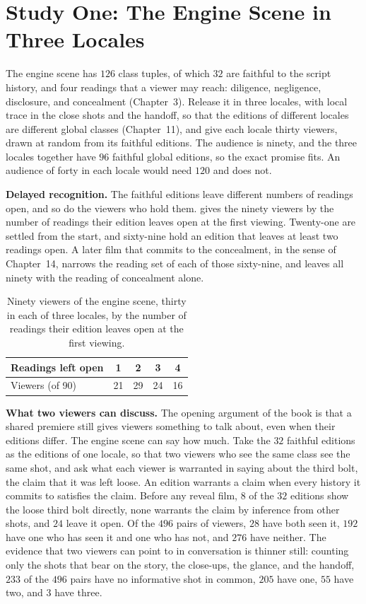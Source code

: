 \documentclass[11pt,twoside,openright]{book}
\theoremstyle{plain}
\theoremstyle{definition}
\theoremstyle{remark}
\begin{document}
\section{Study One: The Engine Scene in Three Locales}\label{sec:engine17}

The engine scene has $126$ class tuples, of which $32$ are faithful to the script history, and four readings that a viewer may reach: diligence, negligence, disclosure, and concealment (Chapter~3). Release it in three locales, with local trace in the close shots and the handoff, so that the editions of different locales are different global classes (Chapter~11), and give each locale thirty viewers, drawn at random from its faithful editions. The audience is ninety, and the three locales together have $96$ faithful global editions, so the exact promise fits. An audience of forty in each locale would need $120$ and does not.

\textbf{Delayed recognition.} The faithful editions leave different numbers of readings open, and so do the viewers who hold them.  gives the ninety viewers by the number of readings their edition leaves open at the first viewing. Twenty-one are settled from the start, and sixty-nine hold an edition that leaves at least two readings open. A later film that commits to the concealment, in the sense of Chapter~14, narrows the reading set of each of those sixty-nine, and leaves all ninety with the reading of concealment alone.

\begin{table}[ht]
\centering
\begin{tabular}{@{}lcccc@{}}
\toprule
Readings left open & 1 & 2 & 3 & 4\\
\midrule
Viewers (of 90) & 21 & 29 & 24 & 16\\
\bottomrule
\end{tabular}
\caption{Ninety viewers of the engine scene, thirty in each of three locales, by the number of readings their edition leaves open at the first viewing.}\label{tab:eng17}
\end{table}

\textbf{What two viewers can discuss.} The opening argument of the book is that a shared premiere still gives viewers something to talk about, even when their editions differ. The engine scene can say how much. Take the $32$ faithful editions as the editions of one locale, so that two viewers who see the same class see the same shot, and ask what each viewer is warranted in saying about the third bolt, the claim that it was left loose. An edition warrants a claim when every history it commits to satisfies the claim. Before any reveal film, $8$ of the $32$ editions show the loose third bolt directly, none warrants the claim by inference from other shots, and $24$ leave it open. Of the $496$ pairs of viewers, $28$ have both seen it, $192$ have one who has seen it and one who has not, and $276$ have neither. The evidence that two viewers can point to in conversation is thinner still: counting only the shots that bear on the story, the close-ups, the glance, and the handoff, $233$ of the $496$ pairs have no informative shot in common, $205$ have one, $55$ have two, and $3$ have three.
\end{document}
